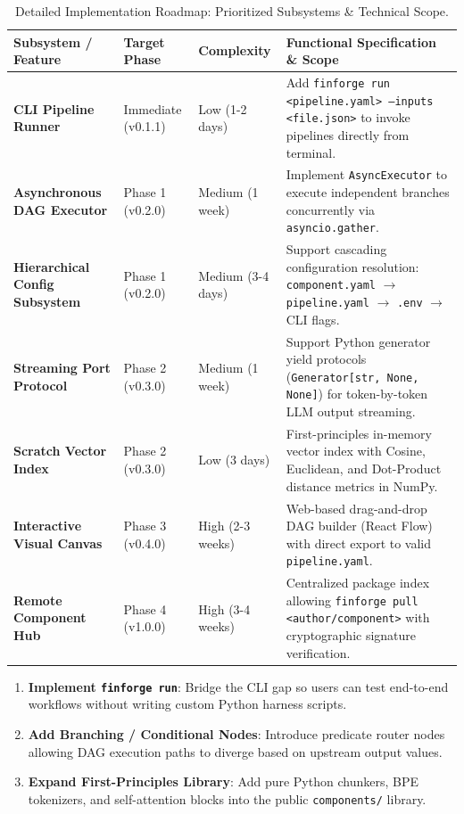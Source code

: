 \documentclass[11pt,a4paper]{article}
\begin{document}
\begin{table}[h!]
\centering
\small
\begin{tabularx}{\textwidth}{p{3.2cm} p{1.8cm} p{2.2cm} X}
\toprule
\textbf{Subsystem / Feature} & \textbf{Target Phase} & \textbf{Complexity} & \textbf{Functional Specification \& Scope} \\
\midrule
\textbf{CLI Pipeline Runner} & Immediate (v0.1.1) & Low (1-2 days) & Add \texttt{finforge run <pipeline.yaml> --inputs <file.json>} to invoke pipelines directly from terminal. \\
\textbf{Asynchronous DAG Executor} & Phase 1 (v0.2.0) & Medium (1 week) & Implement \texttt{AsyncExecutor} to execute independent branches concurrently via \texttt{asyncio.gather}. \\
\textbf{Hierarchical Config Subsystem} & Phase 1 (v0.2.0) & Medium (3-4 days) & Support cascading configuration resolution: \texttt{component.yaml} $\rightarrow$ \texttt{pipeline.yaml} $\rightarrow$ \texttt{.env} $\rightarrow$ CLI flags. \\
\textbf{Streaming Port Protocol} & Phase 2 (v0.3.0) & Medium (1 week) & Support Python generator yield protocols (\texttt{Generator[str, None, None]}) for token-by-token LLM output streaming. \\
\textbf{Scratch Vector Index} & Phase 2 (v0.3.0) & Low (3 days) & First-principles in-memory vector index with Cosine, Euclidean, and Dot-Product distance metrics in NumPy. \\
\textbf{Interactive Visual Canvas} & Phase 3 (v0.4.0) & High (2-3 weeks) & Web-based drag-and-drop DAG builder (React Flow) with direct export to valid \texttt{pipeline.yaml}. \\
\textbf{Remote Component Hub} & Phase 4 (v1.0.0) & High (3-4 weeks) & Centralized package index allowing \texttt{finforge pull <author/component>} with cryptographic signature verification. \\
\bottomrule
\end{tabularx}
\caption{Detailed Implementation Roadmap: Prioritized Subsystems & Technical Scope.}
\label{tab:roadmap}
\end{table}

\begin{calloutbox}
\begin{enumerate}[leftmargin=1.2em, itemsep=2pt]
    \item \textbf{Implement \texttt{finforge run}}: Bridge the CLI gap so users can test end-to-end workflows without writing custom Python harness scripts.
    \item \textbf{Add Branching / Conditional Nodes}: Introduce predicate router nodes allowing DAG execution paths to diverge based on upstream output values.
    \item \textbf{Expand First-Principles Library}: Add pure Python chunkers, BPE tokenizers, and self-attention blocks into the public \texttt{components/} library.
\end{enumerate}
\end{calloutbox}
\end{document}
